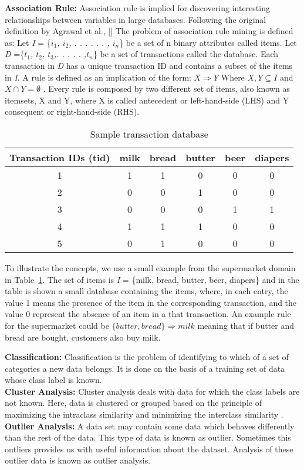 \textbf{Association Rule:}
Association rule is implied for discovering interesting relationships between variables in large databases. Following the original definition by Agrawal et al., [] The problem of association rule mining is defined as: 
Let {\it I} = \{{\it $i_1$, $i_2$, . . . . . . , $i_n$}\} be a set of n binary attributes called items.
Let {\it D} =\{{\it $t_1$, $t_2$, $t_3$,. . . . . ,$t_n$}\} be a set of transactions called the database. 
Each transaction in \textit{D} has a unique transaction ID and contains a subset of the items in \textit{I}.
A rule is defined as an implication of the form:
$X\Rightarrow Y$
Where $X,Y\subseteq I$ and $X \cap Y = \emptyset$ .
Every rule is composed by two different set of items, also known as itemsets, X and Y, where X is called antecedent or left-hand-side (LHS) and Y consequent or right-hand-side (RHS).\\

\begin{table}[h]
\begin{center}
\begin{tabular}{ |c|c|c|c|c|c| } 
\hline
Transaction IDs (tid) & milk & bread & butter & beer & diapers \\
\hline
1 & 1 & 1 & 0 & 0 & 0 \\
2 & 0 & 0 & 1 & 0 & 0\\
3 & 0 & 0 & 0 & 1 & 1\\
4 & 1 & 1 & 1 & 0 & 0\\
5 & 0 & 1 & 0 & 0 & 0\\
\hline
\end{tabular}
\caption{Sample transaction database}
\label{tab:Table14}
\end{center}
\end{table}

To illustrate the concepts, we use a small example from the supermarket domain in Table~\ref{tab:Table14}. The set of items is \textit{I} = \{milk, bread, butter, beer, diapers\} and in the table is shown a small database containing the items, where, in each entry, the value 1 means the presence of the item in the corresponding transaction, and the value 0 represent the absence of an item in a that transaction.
An example rule for the supermarket could be $\{butter, bread\} \Rightarrow {milk}$ meaning that if butter and bread are bought, customers also buy milk.


\textbf{Classification:}
Classification is the problem of identifying to which of a set of categories a new data belongs. It is done on the basis of a training set of data whose class label is known.\\
%
\textbf{Cluster Analysis:}
Cluster analysis deals with data for which the class labels are not known. Here, data is clustered or grouped based on the principle of maximizing the intraclass similarity and minimizing the interclass similarity \cite{book}. \\
%
\textbf{Outlier Analysis:}
A data set may contain some data which behaves differently than the rest of the data. This type of data is known as outlier. Sometimes this outliers provides us with useful information about the dataset. Analysis of these outlier data is known as outlier analysis.  
%
